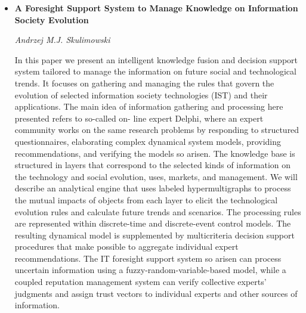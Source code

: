 \begin{itemize}
\item \textbf{A Foresight Support System to Manage Knowledge on Information
Society Evolution}

\textit{Andrzej M.J. Skulimowski}

In this paper we present an intelligent knowledge fusion and decision support
system tailored to manage the information on future social and technological
trends. It focuses on gathering and managing the rules that govern the evolution
of selected information society technologies (IST) and their applications. The
main idea of information gathering and processing here presented refers to
so-called on- line expert Delphi, where an expert community works on the same
research problems by responding to structured questionnaires, elaborating
complex dynamical system models, providing recommendations, and verifying the
models so arisen. The knowledge base is structured in layers that correspond to
the selected kinds of information on the technology and social evolution, uses,
markets, and management. We will describe an analytical engine that uses labeled
hypermultigraphs to process the mutual impacts of objects from each layer to
elicit the technological evolution rules and calculate future trends and
scenarios. The processing rules are represented within discrete-time and
discrete-event control models. The resulting dynamical model is supplemented by
multicriteria decision support procedures that make possible to aggregate
individual expert recommendations. The IT foresight support system so arisen can
process uncertain information using a fuzzy-random-variable-based model, while a
coupled reputation management system can verify collective experts’ judgments
and assign trust vectors to individual experts and other sources of information.
\end{itemize}
